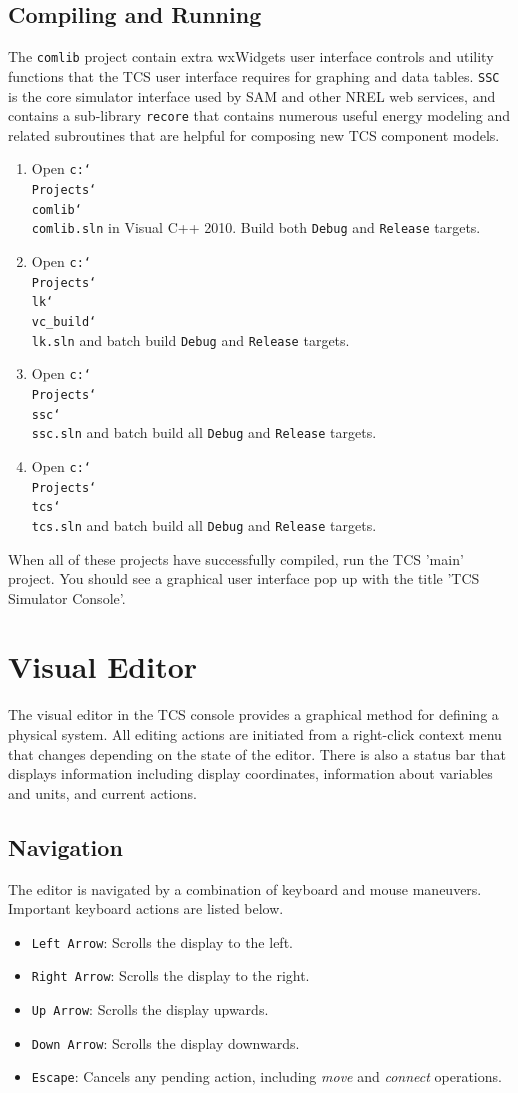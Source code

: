 \documentclass{article}
\newcommand\bslash{\char`\\}
\begin{document}
\subsection{Compiling and Running}

The \texttt{comlib} project contain extra wxWidgets user interface controls and utility functions that the TCS user interface requires for graphing and data tables.  \texttt{SSC} is the core simulator interface used by SAM and other NREL web services, and contains a sub-library \texttt{recore} that contains numerous useful energy modeling and related subroutines that are helpful for composing new TCS component models.

\begin{enumerate}
\item Open \texttt{c:\bslash Projects\bslash comlib\bslash comlib.sln} in Visual C++ 2010.  Build both \texttt{Debug} and \texttt{Release} targets.
\item Open \texttt{c:\bslash Projects\bslash lk\bslash vc\_build\bslash lk.sln} and batch build \texttt{Debug} and \texttt{Release} targets.
\item Open \texttt{c:\bslash Projects\bslash ssc\bslash ssc.sln} and batch build all \texttt{Debug} and \texttt{Release} targets.
\item Open \texttt{c:\bslash Projects\bslash tcs\bslash tcs.sln} and batch build all \texttt{Debug} and \texttt{Release} targets.
\end{enumerate}

When all of these projects have successfully compiled, run the TCS 'main' project.  You should see a graphical user interface pop up with the title 'TCS Simulator Console'.

\section{Visual Editor}

The visual editor in the TCS console provides a graphical method for defining a physical system.  All editing actions are initiated from a right-click context menu that changes depending on the state of the editor.  There is also a status bar that displays information including display coordinates, information about variables and units, and current actions.

\subsection{Navigation}
The editor is navigated by a combination of keyboard and mouse maneuvers.  Important keyboard actions are listed below.
\begin{itemize}
\item \texttt{Left Arrow}:  Scrolls the display to the left.
\item \texttt{Right Arrow}:  Scrolls the display to the right.
\item \texttt{Up Arrow}:  Scrolls the display upwards.
\item \texttt{Down Arrow}:  Scrolls the display downwards.
\item \texttt{Escape}: Cancels any pending action, including \emph{move} and \emph{connect} operations.
\end{itemize}
\end{document}
